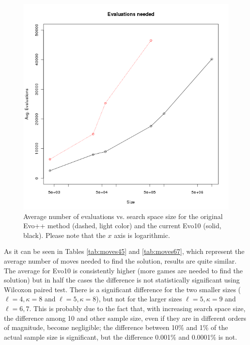 \documentclass[conference]{IEEEtran}
\begin{document}
\begin{figure}[!htb]
\centering
\includegraphics[scale=0.50]{size.png}
\caption{Average number of evaluations 
  vs. search space size for the original Evo++ method (dashed, light
  color) and the current Evo10 (solid, black).  Please note that the
  $x$ axis is logarithmic. \label{fig:size}}
\end{figure} 
%

As it can be seen in Tables \ref{tab:moves45} and \ref{tab:moves67},
which represent the average number of moves needed to find the
solution, results are quite similar. The average for Evo10 is
consistently higher (more games are needed to find the solution)
but in half the cases the difference is not statistically
significant using Wilcoxon paired test. 
There is a significant
difference for the two smaller sizes ($\ell=4,\kappa=8$ and
$\ell=5,\kappa=8$), but not for the larger sizes  $\ell=5,\kappa=9$
and $\ell=6,7$. This is probably due to the fact that, with increasing
search space size, the difference among 10 and other sample size, even
if they are in different orders of magnitude, become negligible; the
difference between 10\% and 1\% of the actual sample size is
significant, but the difference 0.001\% and 0.0001\% is not. 
\end{document}

